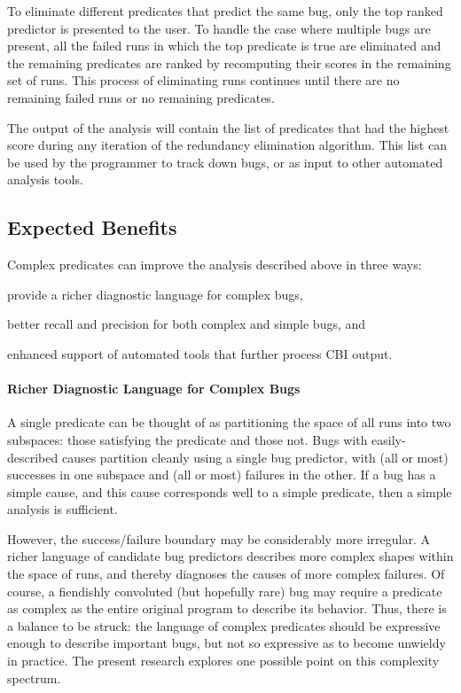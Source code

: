 To eliminate different predicates that predict the same bug, only the top ranked predictor is presented to the user.  To handle the case where multiple bugs are present, all the failed runs in which the top predicate is true are eliminated and the remaining predicates are ranked by recomputing their scores in the remaining set of runs.  This process of eliminating runs continues until there are no remaining failed runs or no remaining predicates.

The output of the analysis will contain the list of predicates that had the highest score during any iteration of the redundancy elimination algorithm.  This list can be used by the programmer to track down bugs, or as input to other automated analysis tools.

\subsection{Expected Benefits}

Complex predicates can improve the analysis described above in three ways:
\begin{inparaenum}[(1)]
  \item provide a richer diagnostic language for complex bugs,
  \item better recall and precision for both complex and simple bugs, and
  \item enhanced support of automated tools that further process CBI output.
  \end{inparaenum}

\paragraph{Richer Diagnostic Language for Complex Bugs}

A single predicate can be thought of as partitioning the space of all runs into two subspaces: those satisfying the predicate and those not. Bugs with easily-described causes partition cleanly using a single bug predictor, with (all or most) successes in one subspace and (all or most) failures in the other.  If a bug has a simple cause, and this cause corresponds well to a simple predicate, then a simple analysis is sufficient.

However, the success/failure boundary may be considerably more irregular.  A richer language of candidate bug predictors describes more complex shapes within the space of runs, and thereby diagnoses the causes of more complex failures.  Of course, a fiendishly convoluted (but hopefully rare) bug may require a predicate as complex as the entire original program to describe its behavior.  Thus, there is a balance to be struck: the language of complex predicates should be expressive enough to describe important bugs, but not so expressive as to become unwieldy in practice.  The present research explores one possible point on this complexity spectrum.

